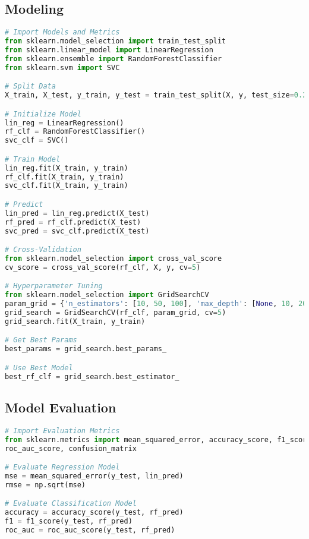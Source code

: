 \documentclass[english, threecolumn]{latex4ei/latex4ei_sheet}
\begin{document}
\begin{sectionbox}
\subsection{Modeling}
\begin{lstlisting}[language=Python, gobble=0]
# Import Models and Metrics
from sklearn.model_selection import train_test_split
from sklearn.linear_model import LinearRegression
from sklearn.ensemble import RandomForestClassifier
from sklearn.svm import SVC

# Split Data
X_train, X_test, y_train, y_test = train_test_split(X, y, test_size=0.2, random_state=42)

# Initialize Model
lin_reg = LinearRegression()
rf_clf = RandomForestClassifier()
svc_clf = SVC()

# Train Model
lin_reg.fit(X_train, y_train)
rf_clf.fit(X_train, y_train)
svc_clf.fit(X_train, y_train)

# Predict
lin_pred = lin_reg.predict(X_test)
rf_pred = rf_clf.predict(X_test)
svc_pred = svc_clf.predict(X_test)

# Cross-Validation
from sklearn.model_selection import cross_val_score
cv_score = cross_val_score(rf_clf, X, y, cv=5)

# Hyperparameter Tuning
from sklearn.model_selection import GridSearchCV
param_grid = {'n_estimators': [10, 50, 100], 'max_depth': [None, 10, 20, 30]}
grid_search = GridSearchCV(rf_clf, param_grid, cv=5)
grid_search.fit(X_train, y_train)

# Get Best Params
best_params = grid_search.best_params_

# Use Best Model
best_rf_clf = grid_search.best_estimator_

\end{lstlisting}
\subsection{Model Evaluation}
\begin{lstlisting}[language=Python, gobble=0]
# Import Evaluation Metrics
from sklearn.metrics import mean_squared_error, accuracy_score, f1_score, \
roc_auc_score, confusion_matrix

# Evaluate Regression Model
mse = mean_squared_error(y_test, lin_pred)
rmse = np.sqrt(mse)

# Evaluate Classification Model
accuracy = accuracy_score(y_test, rf_pred)
f1 = f1_score(y_test, rf_pred)
roc_auc = roc_auc_score(y_test, rf_pred)


\end{lstlisting}
\end{sectionbox}
\end{document}
